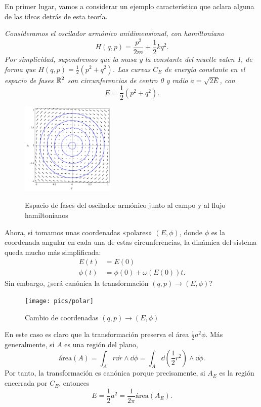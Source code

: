 En primer lugar, vamos a considerar un ejemplo característico que aclara alguna de las ideas detrás de esta teoría.
\begin{ejemplo}
  \em
  Consideramos el oscilador armónico unidimensional, con hamiltoniano
  \begin{equation*}
    H(q,p)=\frac{p^2}{2m}+\frac{1}{2}kq^2.
  \end{equation*}
  Por simplicidad, supondremos que la masa y la constante del muelle valen 1, de forma que $H(q,p)=\frac{1}{2}(p^2+q^2)$. Las curvas $C_E$ de energía constante en el espacio de fases $\mathbb{R}^2$ son circunferencias de centro 0 y radio $a=\sqrt{2E}$, con
  \begin{equation*}
    E=\frac{1}{2}(p^2+q^2).
  \end{equation*}
  \begin{figure}[h]
    \centering
    \includegraphics[width=0.4\textwidth]{pics/oscilador}
    \label{fig:oscilador}
    \caption{Espacio de fases del oscilador armónico junto al campo y al flujo hamiltonianos}
  \end{figure}
  Ahora, si tomamos unas coordenadas «polares» $(E,\phi)$, donde $\phi$ es la coordenada angular en cada una de estas circunferencias, la dinámica del sistema queda mucho más simplificada: 
  \begin{align*}
    E(t)&=E(0) \\
    \phi(t)&=\phi(0)+\omega(E(0))t.
  \end{align*}
  Sin embargo, ¿será canónica la transformación $(q,p) \rightarrow (E,\phi)$?
  \begin{figure}[h]
    \centering
    \texttt{[image: pics/polar]}
    \caption{Cambio de coordenadas $(q,p) \rightarrow (E,\phi)$}
    \label{fig:polar}
  \end{figure}
  En este caso es claro que la transformación preserva el área $\frac{1}{2}a^2\phi$. Más generalmente, si $A$ es una región del plano, 
  \begin{equation*}
    \text{área}(A)= \int_A r \dd r \wedge \dd \phi = \int_A \dd\left(\frac{1}{2}r^2\right) \wedge \dd \phi.
  \end{equation*}
  Por tanto, la transformación es canónica porque precisamente, si $A_E$ es la región encerrada por $C_E$, entonces
  \begin{equation*}
    E=\frac{1}{2}a^2=\frac{1}{2\pi}\text{área}(A_E).
  \end{equation*}


\end{ejemplo}
